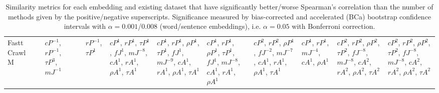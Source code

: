 \documentclass[letterpaper]{article} %
\begin{document}
\begin{sidewaystable*}
\begin{tabular}{l l l l l l l l l l l l}
\midrule
\multirow{6}{1.5cm}{Fastt Crawl M} & \multirow{6}{1.5cm}{} & \multirow{6}{1.5cm}{$cP^{-1}$, $r P^{-1}$, $\tau P^{3}$, $mJ^{-1}$} & \multirow{6}{1.5cm}{} & \multirow{6}{1.5cm}{$r P^{-1}$, $\tau P^{1}$} & \multirow{6}{1.5cm}{$cP^{1}$, $r P^{1}$, $\tau P^{1}$, $fJ^{1}$, $mJ^{-8}$, $cA^{1}$, $r A^{1}$, $\rho A^{1}$, $\tau A^{1}$} & \multirow{6}{1.5cm}{$cP^{1}$, $r P^{1}$, $\rho P^{1}$, $\tau P^{1}$, $fJ^{1}$, $mJ^{-9}$, $cA^{1}$, $r A^{1}$, $\rho A^{1}$, $\tau A^{1}$} & \multirow{6}{1.5cm}{$cP^{1}$, $r P^{1}$, $\rho P^{1}$, $\tau P^{1}$, $fJ^{1}$, $mJ^{-8}$, $cA^{1}$, $r A^{1}$, $\rho A^{1}$} & \multirow{6}{1.5cm}{$cP^{2}$, $r P^{2}$, $\rho P^{1}$, $fJ^{-2}$, $mJ^{-7}$, $cA^{1}$, $r A^{1}$, $\rho A^{1}$, $\tau A^{1}$} & \multirow{6}{1.5cm}{$cP^{1}$, $r P^{1}$, $mJ^{-4}$, $cA^{1}$, $\rho A^{1}$} & \multirow{6}{1.5cm}{$cP^{2}$, $r P^{2}$, $\rho P^{2}$, $\tau P^{2}$, $fJ^{-8}$, $mJ^{-8}$, $cA^{2}$, $r A^{2}$, $\rho A^{2}$, $\tau A^{2}$} & \multirow{6}{1.5cm}{$cP^{2}$, $r P^{2}$, $\rho P^{2}$, $\tau P^{2}$, $fJ^{-8}$, $mJ^{-8}$, $cA^{2}$, $r A^{2}$, $\rho A^{2}$, $\tau A^{2}$} \\ \\ \\ \\ \\ \\
\bottomrule
    \end{tabular}
    \caption{Similarity metrics for each embedding and existing dataset that have significantly better/worse Spearman's correlation than the number of methods given by the positive/negative superscripts. Significance measured by bias-corrected and accelerated (BCa)
bootstrap confidence intervals with $\alpha = 0.001$/$0.008$ (word/sentence embeddings), i.e. $\alpha = 0.05$ with Bonferroni correction.}
    \label{tab:significance_existingDatasets_methods3} 
\end{sidewaystable*}
\end{document}
